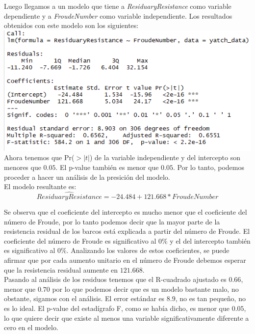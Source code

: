 \documentclass[twoside]{article}
\begin{document}
\begin{multicols}{2}
Luego llegamos a un modelo que tiene a \textit{ResiduaryResistance} como variable dependiente y a \textit{FroudeNumber} como variable independiente. Los resultados obtenidos con este modelo son los siguientes:\\

\includegraphics[scale = 0.4]{images/pic_03.png} \\

Ahora tenemos que Pr($>|t|$) de la variable independiente y del intercepto son menores que $0.05$. El p-value tambi\'en es menor que $0.05$. Por lo tanto, podemos proceder a hacer un an\'alisis de la presici\'on del modelo.\\
El modelo resultante es:
$$\hat{ResiduaryResistance} = -24.484 + 121.668 * FroudeNumber$$

Se observa que el coeficiente del intercepto es mucho menor que el coeficiente del n\'umero de Froude, por lo tanto podemos decir que la mayor parte de la resistencia residual de los barcos est\'a explicada a partir del n\'umero de Froude. El coeficiente del n\'umero de Froude es significativo al $0\%$ y el del intercepto tambi\'en es significativo al $0\%$. Analizando los valores de estos coeficientes, se puede afirmar que por cada aumento unitario en el n\'umero de Froude debemos esperar que la resistencia residual aumente en $121.668$. \\

Pasando al an\'alisis de los residuos tenemos que el R-cuadrado ajustado es $0.66$, menor que $0.70$ por lo que podemos decir que  es un modelo bastante malo, no obstante, sigamos con el an\'alisis. El error est\'andar es $8.9$, no es tan peque\~no, no es lo ideal. El p-value del estad\'igrafo F, como se hab\'ia dicho, es menor que $0.05$, lo que quiere decir que existe al menos una variable significativamente diferente a cero en el modelo.\\


\end{multicols}
\end{document}
